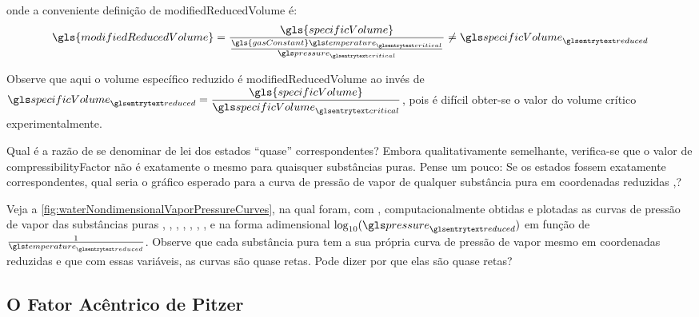     onde a conveniente definição de \gls{modifiedReducedVolume} é:
	\begin{equation} \label{eq:1.23}
        \gls{modifiedReducedVolume}
        =
        \frac{
            \gls{specificVolume}
        }{
            \frac{
                \gls{gasConstant}
                \gsub{temperature}{critical}
            }{
                \gsub{pressure}{critical}
            }
        }
        \neq
        \gsub{specificVolume}{reduced}
    \end{equation}

    Observe que aqui o volume específico reduzido é \gls{modifiedReducedVolume}
    ao invés de $\gsub{specificVolume}{reduced} =
    \dfrac{\gls{specificVolume}}{\gsub{specificVolume}{critical}}$, pois é
    difícil obter-se o valor do volume crítico 
    experimentalmente.

    Qual é a razão de se denominar de lei dos estados \enquote{quase}
    correspondentes? Embora qualitativamente semelhante, verifica-se que o
    valor de
    \gls{compressibilityFactor} não é exatamente o mesmo para quaisquer
    substâncias puras. Pense um pouco: Se os estados fossem exatamente
    correspondentes, qual seria o gráfico esperado para a curva de pressão de
    vapor de qualquer substância pura em coordenadas reduzidas
    ,?

    Veja a \cref{fig:waterNondimensionalVaporPressureCurves}, na qual foram,
    com , computacionalmente obtidas e plotadas as curvas de
    pressão de vapor das substâncias puras , , , ,
    , , ,  e  na forma adimensional
    $\log_{10}(\gsub{pressure}{reduced})$ em função de
    $\frac{1}{\gsub{temperature}{reduced}}$. Observe que cada substância pura
    tem a sua própria curva de pressão de vapor mesmo em coordenadas reduzidas
    e que com essas variáveis, as curvas são quase retas.  Pode dizer por que
    elas são quase retas?


    \subsection{O Fator Acêntrico de Pitzer}

